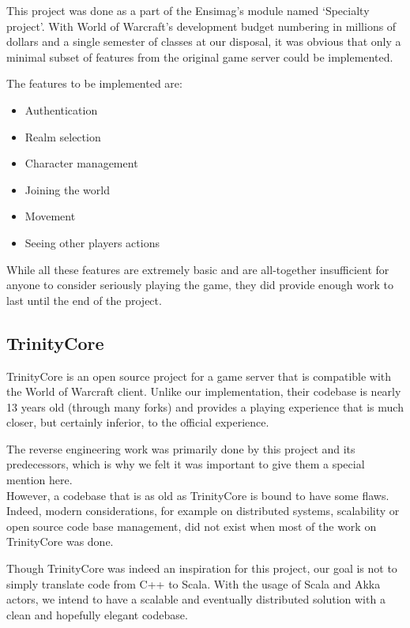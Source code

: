 \documentclass[paper=a4, fontsize=11pt]{scrartcl}
\begin{document}
This project was done as a part of the Ensimag's module named `Specialty
project'.
With World of Warcraft's development budget numbering in millions of dollars and
a single semester of classes at our disposal, it was obvious that only a minimal
subset of features from the original game server could be implemented.\

The features to be implemented are:
\begin{itemize}
    \item Authentication
    \item Realm selection
    \item Character management
    \item Joining the world
    \item Movement
    \item Seeing other players actions
\end{itemize}

While all these features are extremely basic and are all-together insufficient
for anyone to consider seriously playing the game, they did provide enough work
to last until the end of the project.

\subsection{TrinityCore}

TrinityCore is an open source project for a game server that is compatible with
the World of Warcraft client.
Unlike our implementation, their codebase is nearly 13 years old (through many
forks) and provides a playing experience that is much closer, but certainly
inferior, to the official experience.

The reverse engineering work was primarily done by this project and its
predecessors, which is why we felt it was important to give them a special
mention here.\\

However, a codebase that is as old as TrinityCore is bound to have some
flaws. Indeed, modern considerations, for example on distributed systems,
scalability or open source code base management, did not exist when most of the
work on TrinityCore was done.

Though TrinityCore was indeed an inspiration for this project, our goal is not
to simply translate code from C++ to Scala.
With the usage of Scala and Akka actors, we intend to have a scalable and
eventually distributed solution with a clean and hopefully elegant codebase.
\end{document}
